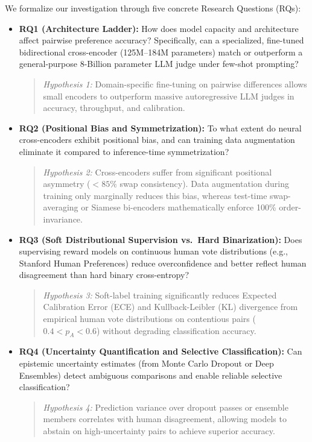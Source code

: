 \documentclass[12pt,a4paper]{article}
\begin{document}
We formalize our investigation through five concrete Research Questions (RQs):

\begin{itemize}
    \item \textbf{RQ1 (Architecture Ladder):} How does model capacity and architecture affect pairwise preference accuracy? Specifically, can a specialized, fine-tuned bidirectional cross-encoder (125M--184M parameters) match or outperform a general-purpose 8-Billion parameter LLM judge under few-shot prompting?
    \begin{quote}
        \emph{Hypothesis 1:} Domain-specific fine-tuning on pairwise differences allows small encoders to outperform massive autoregressive LLM judges in accuracy, throughput, and calibration.
    \end{quote}

    \item \textbf{RQ2 (Positional Bias and Symmetrization):} To what extent do neural cross-encoders exhibit positional bias, and can training data augmentation eliminate it compared to inference-time symmetrization?
    \begin{quote}
        \emph{Hypothesis 2:} Cross-encoders suffer from significant positional asymmetry ($<85\%$ swap consistency). Data augmentation during training only marginally reduces this bias, whereas test-time swap-averaging or Siamese bi-encoders mathematically enforce 100\% order-invariance.
    \end{quote}

    \item \textbf{RQ3 (Soft Distributional Supervision vs.\ Hard Binarization):} Does supervising reward models on continuous human vote distributions (e.g., Stanford Human Preferences) reduce overconfidence and better reflect human disagreement than hard binary cross-entropy?
    \begin{quote}
        \emph{Hypothesis 3:} Soft-label training significantly reduces Expected Calibration Error (ECE) and Kullback-Leibler (KL) divergence from empirical human vote distributions on contentious pairs ($0.4 < p_A < 0.6$) without degrading classification accuracy.
    \end{quote}

    \item \textbf{RQ4 (Uncertainty Quantification and Selective Classification):} Can epistemic uncertainty estimates (from Monte Carlo Dropout or Deep Ensembles) detect ambiguous comparisons and enable reliable selective classification?
    \begin{quote}
        \emph{Hypothesis 4:} Prediction variance over dropout passes or ensemble members correlates with human disagreement, allowing models to abstain on high-uncertainty pairs to achieve superior accuracy.
    \end{quote}


\end{itemize}
\end{document}
